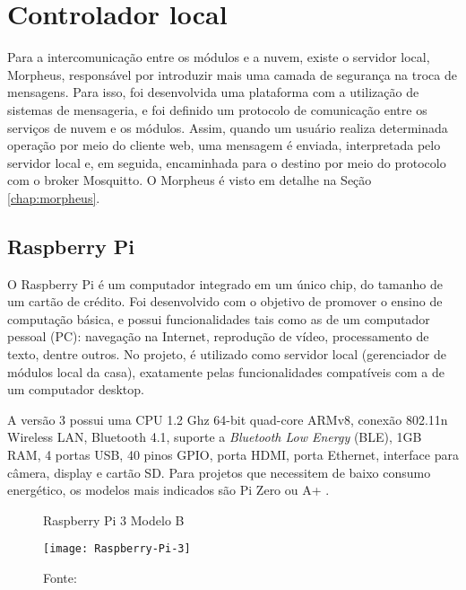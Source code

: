 \section{Controlador local}
Para a intercomunicação entre os módulos e a nuvem, existe o servidor local, Morpheus, responsável por introduzir mais uma camada de segurança na troca de mensagens. Para isso, foi desenvolvida uma plataforma com a utilização de sistemas de mensageria, e foi definido um protocolo de comunicação entre os serviços de nuvem e os módulos. Assim, quando um usuário realiza determinada operação por meio do cliente web, uma mensagem é enviada, interpretada pelo servidor local e, em seguida, encaminhada para o destino por meio do protocolo \wmqtt{} com o broker Mosquitto. O Morpheus é visto em detalhe na Seção \ref{chap:morpheus}.

\subsection{Raspberry Pi}
O Raspberry Pi é um computador integrado em um único chip, do tamanho de um cartão de crédito. Foi desenvolvido com o objetivo de promover o ensino de computação básica, e possui funcionalidades tais como as de um computador pessoal (PC): navegação na Internet, reprodução de vídeo, processamento de texto, dentre outros. No projeto, é utilizado como servidor local (gerenciador de módulos local da casa), exatamente pelas funcionalidades compatíveis com a de um computador desktop.

A versão 3 possui uma CPU 1.2 Ghz 64-bit quad-core ARMv8, conexão 802.11n Wireless LAN, Bluetooth 4.1, suporte a \emph{Bluetooth Low Energy} (BLE), 1GB RAM, 4 portas USB, 40 pinos GPIO, porta HDMI, porta Ethernet, interface para câmera, display e cartão SD. Para projetos que necessitem de baixo consumo energético, os modelos mais indicados são Pi Zero ou A+ \cite{raspPi}.

\begin{figure}[H]
	\centering
	\caption{Raspberry Pi 3 Modelo B}
  \texttt{[image: Raspberry-Pi-3]}
	\caption*{Fonte: \cite{raspPi}}
\label{fig:Raspberry-Pi-3}
\end{figure}
